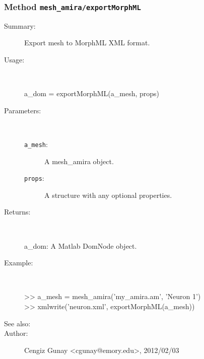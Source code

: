 \subsubsection[Method \texttt{exportMorphML}]{Method \texttt{mesh\_amira/exportMorphML}}%
%
\label{ref_mesh_amira__exportMorphML}%
\hypertarget{ref_mesh_amira__exportMorphML}{}%
\begin{description}
\item[Summary:]Export mesh to MorphML XML format.
%
\item[Usage:]~%
\begin{lyxcode}%
a\_dom = exportMorphML(a\_mesh, props)
%
\end{lyxcode}%
%
%
\item[Parameters:]~
\begin{description}%
\item[\texttt{a\_mesh}:]
 A mesh\_amira object.
\item[\texttt{props}:]
 A structure with any optional properties.
\end{description}%
%
\item[Returns:
]~

   a\_dom: A Matlab DomNode object.
%
\item[Example:]~
\begin{lyxcode} >> a\_mesh = mesh\_amira('my\_amira.am', 'Neuron 1')
\\%
 >> xmlwrite('neuron.xml', exportMorphML(a\_mesh))
\\%
\end{lyxcode}
%
\item[See also:]%
%
\item[Author:]%
Cengiz Gunay <cgunay@emory.edu>, 2012/02/03
%
\end{description}
\methodline%
